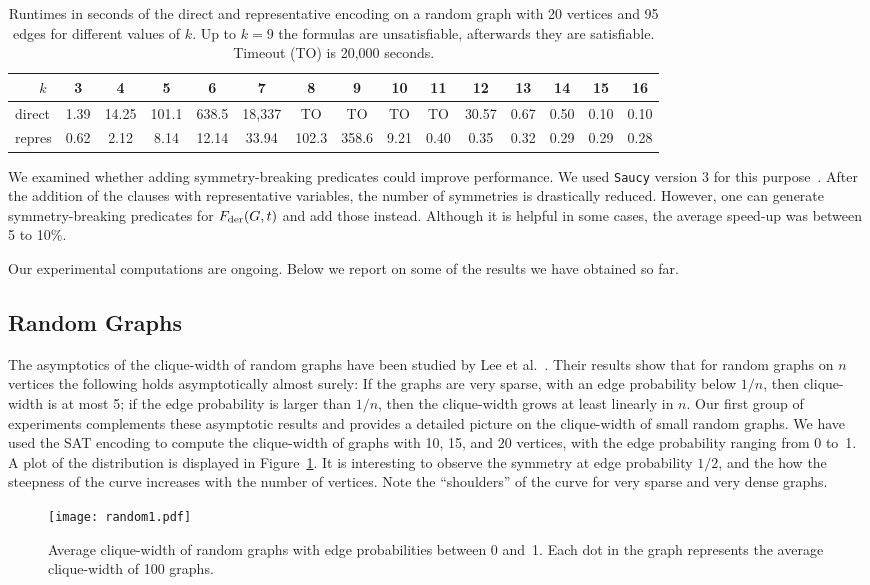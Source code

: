 \documentclass[10pt,usletter]{article}
\theoremstyle{remark}
\newcommand{\Fder}{F_{\text{\normalfont der}}}
\begin{document}
\begin{table}[htb]
\centering
\caption{Runtimes in seconds of the direct and representative encoding on a random graph
  with 20 vertices and 95 edges for different values of $k$. Up to $k=9$ the formulas
  are unsatisfiable, afterwards they are satisfiable. Timeout (TO) is 20,000 seconds.}
\label{tab:random20}

\medskip\small\setlength{\tabcolsep}{4pt}
\begin{tabular}{@{}l@{~~}|@{~~}ccccccc@{~~}|@{~~}ccccccc@{}}
\toprule
~~~$k$ & 3 & 4 & 5 & 6 & 7 & 8 & 9 & 10 & 11 & 12 & 13 & 14 & 15 & 16\\
\midrule
direct & 1.39 & 14.25 & 101.1 & 638.5 & 18,337 & TO & TO & TO & TO & 30.57 & 0.67 & 0.50 & 0.10 & 0.10\\
repres &  0.62 & 2.12 & 8.14 & 12.14 & 33.94 & 102.3 & 358.6 &9.21 & 0.40 & 0.35 &0.32 & 0.29 & 0.29 & 0.28\\
\toprule
\end{tabular}
\end{table}

We examined whether adding symmetry-breaking predicates could improve
performance. We used {\tt Saucy} version 3 for this
purpose~\cite{KatebiSakallahMarkov12}. After the addition of the
clauses with representative variables, the number of symmetries is drastically reduced.
However, one can generate symmetry-breaking
predicates for $\Fder(G,t)$ and add those instead. Although it is helpful
in some cases, the average speed-up was between 5 to 10\%.

Our experimental computations are ongoing. Below we report on some
of the results we have obtained so far.

\subsection{Random Graphs}


The asymptotics of the clique-width of random graphs have been studied
by Lee et al.~\cite{LeeLeeOum12}.  Their results show that for random
graphs on $n$ vertices the following holds asymptotically almost surely: If the
graphs are very sparse, with an edge probability below $1/n$, then
clique-width is at most 5; if the edge probability is larger than
$1/n$, then the clique-width grows at least linearly in $n$.  Our first group
of experiments complements these asymptotic results and provides a
detailed picture on the clique-width of small random graphs.  We have
used the SAT encoding to compute the clique-width of graphs with 10,
15, and 20 vertices, with the edge probability ranging from 0 to~1. A
plot of the distribution is displayed in Figure~\ref{fig:random}.  It is
interesting to observe the symmetry at edge probability $1/2$, and the
how the steepness of the curve increases with the number of
vertices. Note the ``shoulders'' of the curve for very sparse and very
dense graphs.
\begin{figure}[htb]
\centering
\texttt{[image: random1.pdf]}
\caption{Average clique-width of random graphs with edge probabilities between 0
  and~1. Each dot in the graph represents the average
  clique-width of 100 graphs. 
\label{fig:random}}
\end{figure}
  
\end{document}
